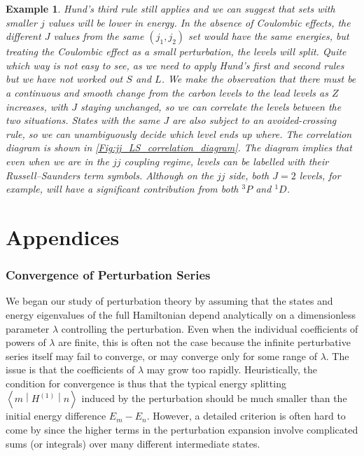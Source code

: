 \documentclass{article}
\theoremstyle{plain}\theoremheaderfont{\normalfont\itshape}\theorembodyfont{\rmfamily}\theoremseparator{.}\newtheorem*{rem}{Remark}\newtheorem*{ex}{Example}\newtheorem*{proof}{Proof}\newtheorem*{altp}{Alternative proof}
\theoremstyle{plain}\theoremheaderfont{\normalfont\bfseries}\theorembodyfont{\rmfamily}\theoremseparator{.}\newtheorem{thm}{Theorem}[section]\newtheorem{lem}[thm]{Lemma}\newtheorem{prop}[thm]{Proposition}\newtheorem*{cor}{Corollary}\newtheorem{defn}[thm]{Definition}\newtheorem{clm}[thm]{Claim}\newtheorem{clminproof}{Claim}
\theoremstyle{break}\theoremheaderfont{\normalfont\itshape}\theorembodyfont{\rmfamily}\theoremseparator{.\medskip}\newtheorem*{proofskip}{Proof}\newtheorem*{exs}{Examples}\newtheorem*{rems}{Remarks}
\theoremstyle{break}\theoremheaderfont{\normalfont\bfseries}\theorembodyfont{\rmfamily}\theoremseparator{.\medskip}\newtheorem{lemskip}[thm]{Lemma}\newtheorem{defnskip}[thm]{Definition}\newtheorem{propskip}[thm]{Proposition}\newtheorem{thmskip}[thm]{Theorem}
\numberwithin{equation}{section}
\newcommand{\mel}[3]{\left\langle #1 \middle| #2 \middle| #3 \right\rangle}
\begin{document}
\begin{ex}
        Hund's third rule still applies and we can suggest that sets with smaller \(j\) values will be lower in energy. In the absence of Coulombic effects, the different \(J\) values from the same \((j_1,j_2)\) set would have the same energies, but treating the Coulombic effect as a small perturbation, the levels will split. Quite which way is not easy to see, as we need to apply Hund's first and second rules but we have not worked out \(S\) and \(L\). We make the observation that there must be a continuous and smooth change from the carbon levels to the lead levels as \(Z\) increases, with \(J\) staying unchanged, so we can correlate the levels between the two situations. States with the same \(J\) are also subject to an avoided-crossing rule, so we can unambiguously decide which level ends up where. The correlation diagram is shown in \cref{Fig:jj_LS_correlation_diagram}. The diagram implies that even when we are in the \(jj\) coupling regime, levels can be labelled with their Russell--Saunders term symbols. Although on the \(jj\) side, both \(J=2\) levels, for example, will have a significant contribution from both \(^3P\) and \(^1D\).
    \end{ex}

    \newpage
    \part*{Appendices}
    \appendix
    
    \section{Convergence of Perturbation Series}\label{Appendix:Converge}
    We began our study of perturbation theory by assuming that the states and energy eigenvalues of the full Hamiltonian depend analytically on a dimensionless parameter \(\lambda\) controlling the perturbation. Even when the individual coefficients of powers of \(\lambda\) are finite, this is often not the case because the infinite perturbative series itself may fail to converge, or may converge only for some range of \(\lambda\). The issue is that the coefficients of \(\lambda\) may grow too rapidly. Heuristically, the condition for convergence is thus that the typical energy splitting \(\mel{m}{H^{(1)}}{n}\) induced by the perturbation should be much smaller than the initial energy difference \(E_m-E_n\). However, a detailed criterion is often hard to come by since the higher terms in the perturbation expansion involve complicated sums (or integrals) over many different intermediate states.
\end{document}
